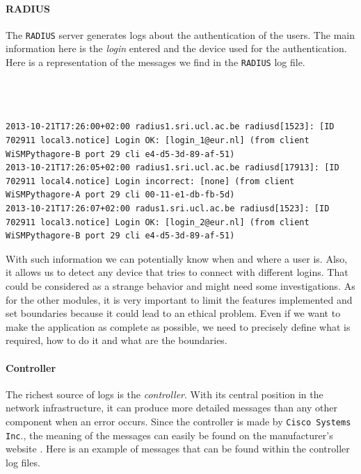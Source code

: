 \paragraph*{RADIUS}
The \texttt{RADIUS} server generates logs about the authentication of the users. The main information here is the \emph{login} entered and the device used for the authentication. Here is a representation of the messages we find in the \texttt{RADIUS} log file.\\\\\\\\

\begin{lstlisting}[frame=single,breaklines=true,caption={Example of a \texttt{RADIUS} log file}]
2013-10-21T17:26:00+02:00 radius1.sri.ucl.ac.be radiusd[1523]: [ID 702911 local3.notice] Login OK: [login_1@eur.nl] (from client WiSMPythagore-B port 29 cli e4-d5-3d-89-af-51)
2013-10-21T17:26:05+02:00 radius1.sri.ucl.ac.be radiusd[17913]: [ID 702911 local4.notice] Login incorrect: [none] (from client WiSMPythagore-A port 29 cli 00-11-e1-db-fb-5d)
2013-10-21T17:26:07+02:00 radus1.sri.ucl.ac.be radiusd[1523]: [ID 702911 local3.notice] Login OK: [login_2@eur.nl] (from client WiSMPythagore-B port 29 cli e4-d5-3d-89-af-51)
\end{lstlisting}

With such information we can potentially know when and where a user is. Also, it allows us to detect any device that tries to connect with different logins. That could be considered as a strange behavior and might need some investigations. As for the other modules, it is very important to limit the features implemented and set boundaries because it could lead to an ethical problem. Even if we want to make the application as complete as possible, we need to precisely define what is required, how to do it and what are the boundaries.


\paragraph*{Controller}

The richest source of logs is the \emph{controller}. With its central position in the network infrastructure, it can produce more detailed messages than any other component when an error occurs. Since the controller is made by \texttt{Cisco Systems Inc}., the meaning of the messages can easily be found on the manufacturer's website \cite{syslogCisco}. Here is an example of messages that can be found within the controller log files.\\

